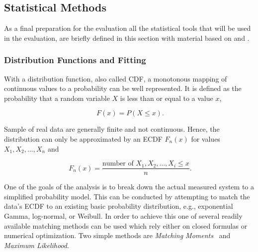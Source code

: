 \subsection{Statistical Methods}

As a final preparation for the evaluation all the statistical tools that will be used in the evaluation, are briefly defined in this section with material based on \cite{field2012discovering} and \cite{Knuth:1997:ACP:270146}.


\subsubsection{Distribution Functions and Fitting}

With a distribution function, also called \gls{CDF}, a monotonous mapping of continuous values to a probability can be well represented. It is defined as the probability that a random variable $X$ is less than or equal to a value $x$,

\begin{equation}
	\phantom{.} F(x) = P(X\leq x)\text{.}
\end{equation}

Sample of real data are generally finite and not continuous. Hence, the distribution can only be approximated by an \gls{ECDF} $F_n(x)$ for values $X_1, X_2, \ldots , X_n$ and

\begin{equation}
	\phantom{.}F_n(x) = \frac{\text{number of }X_1, X_2, \ldots , X_i \leq x}{n}\text{.}
\end{equation}

One of the goals of the analysis is to break down the actual measured system to a simplified probability model. This can be conducted by attempting to match the data's \gls{ECDF} to an existing basic probability distribution, e.g., exponential Gamma, log-normal, or Weibull. 
In order to achieve this one of several readily available matching methods can be used which rely either on closed formulas or numerical optimization. Two simple methods are \textit{Matching Moments}~\cite[pp.~99-143]{vose2000risk} and \textit{Maximum Likelihood}.

